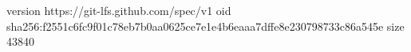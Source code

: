 version https://git-lfs.github.com/spec/v1
oid sha256:f2551c6fc9f01c78eb7b0aa0625ce7e1e4b6eaaa7dffe8e230798733c86a545e
size 43840
